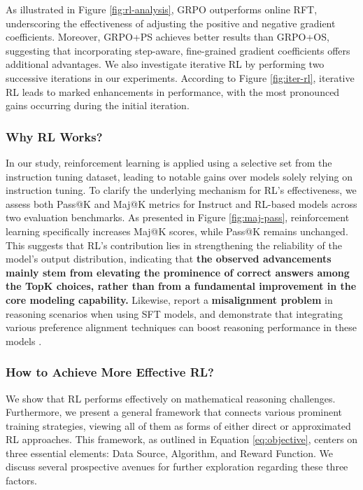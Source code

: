 \begin{itemize}[topsep=0pt]
\begin{itemize}[topsep=0pt]
As illustrated in Figure \ref{fig:rl-analysis}, GRPO outperforms online RFT, underscoring the effectiveness of adjusting the positive and negative gradient coefficients. Moreover, GRPO+PS achieves better results than GRPO+OS, suggesting that incorporating step-aware, fine-grained gradient coefficients offers additional advantages. We also investigate iterative RL by performing two successive iterations in our experiments. According to Figure \ref{fig:iter-rl}, iterative RL leads to marked enhancements in performance, with the most pronounced gains occurring during the initial iteration.

\subsubsection{Why RL Works?} In our study, reinforcement learning is applied using a selective set from the instruction tuning dataset, leading to notable gains over models solely relying on instruction tuning. To clarify the underlying mechanism for RL's effectiveness, we assess both Pass@K and Maj@K metrics for Instruct and RL-based models across two evaluation benchmarks. As presented in Figure \ref{fig:maj-pass}, reinforcement learning specifically increases Maj@K scores, while Pass@K remains unchanged. This suggests that RL’s contribution lies in strengthening the reliability of the model's output distribution, indicating that \textbf{the observed advancements mainly stem from elevating the prominence of correct answers among the TopK choices, rather than from a fundamental improvement in the core modeling capability.} Likewise, \citep{wang2023making} report a \textbf{misalignment problem} in reasoning scenarios when using SFT models, and demonstrate that integrating various preference alignment techniques can boost reasoning performance in these models \citep{yuan2023rrhf,song2023preference,wang2023making}.

\subsubsection{How to Achieve More Effective RL?}
\label{sec:effec_rl}
We show that RL performs effectively on mathematical reasoning challenges. Furthermore, we present a general framework that connects various prominent training strategies, viewing all of them as forms of either direct or approximated RL approaches. This framework, as outlined in Equation \ref{eq:objective}, centers on three essential elements: Data Source, Algorithm, and Reward Function. We discuss several prospective avenues for further exploration regarding these three factors.


\end{itemize}
\end{itemize}
